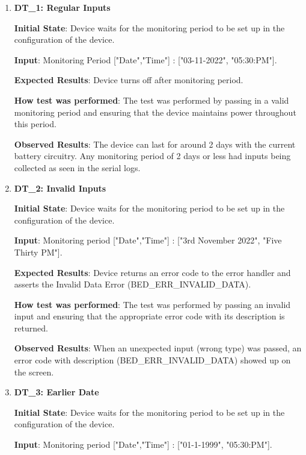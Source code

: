 \documentclass[12pt, titlepage]{article}
\begin{document}
\begin{enumerate}

  \item{\textbf{DT\_1: Regular Inputs}\\}\label{DT1}

  \textbf{Initial State}: Device waits for the monitoring period to be set up in the configuration of the device.

  \textbf{Input}: Monitoring Period ["Date","Time"]  : ["03-11-2022", "05:30:PM"].

  \textbf{Expected Results}: Device turns off after monitoring period.

  \textbf{How test was performed}: The test was performed by passing in a valid monitoring period and ensuring that the device maintains power throughout this period.

  \textbf{Observed Results}: The device can last for around 2 days with the current battery circuitry. Any monitoring period of 2 days or less had inputs being collected as seen in the serial logs.

  \item{\textbf{DT\_2: Invalid Inputs}\\}\label{DT2}

  \textbf{Initial State}: Device waits for the monitoring period to be set up in the configuration of the device.

  \textbf{Input}: Monitoring period ["Date","Time"] : ["3rd November 2022", "Five Thirty PM"].

  \textbf{Expected Results}: Device returns an error code to the error handler and asserts the Invalid Data Error (BED\_ERR\_INVALID\_DATA).

  \textbf{How test was performed}: The test was performed by passing an invalid input and ensuring that the appropriate error code with its description is returned.

  \textbf{Observed Results}: When an unexpected input (wrong type) was passed, an error code with description (BED\_ERR\_INVALID\_DATA) showed up on the screen.

  \item{\textbf{DT\_3: Earlier Date}\\}\label{DT3}

  \textbf{Initial State}: Device waits for the monitoring period to be set up in the configuration of the device.

  \textbf{Input}: Monitoring period ["Date","Time"] : ["01-1-1999", "05:30:PM"].


\end{enumerate}
\end{document}
